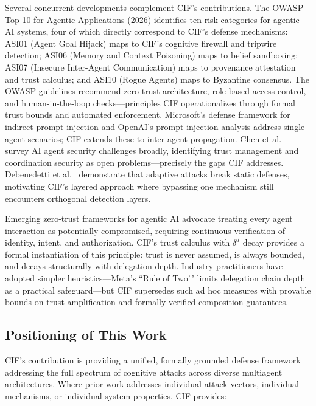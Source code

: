\documentclass[
]{article}
\begin{document}
Several concurrent developments complement CIF's contributions. The
OWASP Top 10 for Agentic Applications (2026) \cite{owasp2025agentic}
identifies ten risk categories for agentic AI systems, four of which
directly correspond to CIF's defense mechanisms: ASI01 (Agent Goal
Hijack) maps to CIF's cognitive firewall and tripwire detection; ASI06
(Memory and Context Poisoning) maps to belief sandboxing; ASI07
(Insecure Inter-Agent Communication) maps to provenance attestation and
trust calculus; and ASI10 (Rogue Agents) maps to Byzantine consensus.
The OWASP guidelines recommend zero-trust architecture, role-based
access control, and human-in-the-loop checks---principles CIF
operationalizes through formal trust bounds and automated enforcement.
Microsoft's defense framework for indirect prompt injection
\cite{microsoft2025indirect} and OpenAI's prompt injection analysis
\cite{openai2025promptinjection} address single-agent scenarios; CIF
extends these to inter-agent propagation. Chen et
al.~\cite{aiagentssurvey2025} survey AI agent security challenges
broadly, identifying trust management and coordination security as open
problems---precisely the gaps CIF addresses. Debenedetti et
al.~\cite{adaptive2025attacks} demonstrate that adaptive attacks break
static defenses, motivating CIF's layered approach where bypassing one
mechanism still encounters orthogonal detection layers.

Emerging zero-trust frameworks for agentic AI \cite{zerotrustagents2025}
advocate treating every agent interaction as potentially compromised,
requiring continuous verification of identity, intent, and
authorization. CIF's trust calculus with \(\delta^d\) decay provides a
formal instantiation of this principle: trust is never assumed, is
always bounded, and decays structurally with delegation depth. Industry
practitioners have adopted simpler heuristics---Meta's ``Rule of Two'\,'
limits delegation chain depth as a practical safeguard---but CIF
supersedes such ad hoc measures with provable bounds on trust
amplification and formally verified composition guarantees.

\subsection{Positioning of This Work}\label{positioning-of-this-work}

CIF's contribution is providing a unified, formally grounded defense
framework addressing the full spectrum of cognitive attacks across
diverse multiagent architectures. Where prior work addresses individual
attack vectors, individual mechanisms, or individual system properties,
CIF provides:
\end{document}
